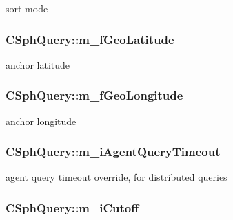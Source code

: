sort mode 

\hypertarget{classCSphQuery_a4b33b32f89324d816460e210e183ef6d}{
\subsubsection[{m\-\_\-f\-Geo\-Latitude}]{ C\-Sph\-Query\-::m\-\_\-f\-Geo\-Latitude}}\label{classCSphQuery_a4b33b32f89324d816460e210e183ef6d}


anchor latitude 

\hypertarget{classCSphQuery_a9f142b82596ebc0dec6b69edb9467ac9}{
\subsubsection[{m\-\_\-f\-Geo\-Longitude}]{ C\-Sph\-Query\-::m\-\_\-f\-Geo\-Longitude}}\label{classCSphQuery_a9f142b82596ebc0dec6b69edb9467ac9}


anchor longitude 

\hypertarget{classCSphQuery_a501ee30c34993b5644a58f3cdc48ef6a}{
\subsubsection[{m\-\_\-i\-Agent\-Query\-Timeout}]{ C\-Sph\-Query\-::m\-\_\-i\-Agent\-Query\-Timeout}}\label{classCSphQuery_a501ee30c34993b5644a58f3cdc48ef6a}


agent query timeout override, for distributed queries 

\hypertarget{classCSphQuery_a8ce53c13bb1c039139f86e5726bc0f9b}{
\subsubsection[{m\-\_\-i\-Cutoff}]{ C\-Sph\-Query\-::m\-\_\-i\-Cutoff}}\label{classCSphQuery_a8ce53c13bb1c039139f86e5726bc0f9b}


